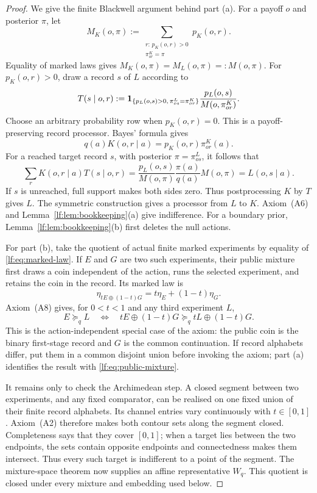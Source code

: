 \begin{proof}
We give the finite Blackwell argument behind part \textup{(a)}.  For a payoff
$o$ and posterior $\pi$, let
\[
M_K(o,\pi):=
\sum_{\substack{r:\,p_K(o,r)>0\\ \pi^K_{or}=\pi}} p_K(o,r).
\]
Equality of marked laws gives $M_K(o,\pi)=M_L(o,\pi)=:M(o,\pi)$.
For $p_K(o,r)>0$, draw a record $s$ of $L$ according to
\begin{equation}
T(s\mid o,r):=
\mathbf 1_{\{p_L(o,s)>0,\,\pi^L_{os}=\pi^K_{or}\}}
\frac{p_L(o,s)}{M(o,\pi^K_{or})}.
\label{lf:eq:matching-processor}
\end{equation}
Choose an arbitrary probability row when $p_K(o,r)=0$.  This is a
payoff-preserving record processor.  Bayes' formula gives
\[
q(a)K(o,r\mid a)=p_K(o,r)\pi^K_{or}(a).
\]
For a reached target record $s$, with posterior $\pi=\pi^L_{os}$, it follows
that
\[
\sum_r K(o,r\mid a)T(s\mid o,r)
=\frac{p_L(o,s)}{M(o,\pi)}
  \frac{\pi(a)}{q(a)}M(o,\pi)
=L(o,s\mid a).
\]
If $s$ is unreached, full support makes both sides zero.  Thus postprocessing
$K$ by $T$ gives $L$.  The symmetric construction gives a
processor from $L$ to $K$.  Axiom~\textup{(A6)} and
Lemma~\ref{lf:lem:bookkeeping}\textup{(a)} give indifference.  For a boundary
prior, Lemma~\ref{lf:lem:bookkeeping}\textup{(b)} first deletes the null
actions.

For part \textup{(b)}, take the quotient of actual finite marked experiments by
equality of \eqref{lf:eq:marked-law}.  If $E$ and $G$ are two such experiments,
their public mixture first draws a coin independent of the action, runs the
selected experiment, and retains the coin in the record.  Its marked law is
\begin{equation}
\eta_{tE\oplus(1-t)G}=t\eta_E+(1-t)\eta_G.
\label{lf:eq:public-mixture}
\end{equation}
Axiom~\textup{(A8)} gives, for $0<t<1$ and any third experiment $L$,
\begin{equation}
E\succeq_q L
\quad\Longleftrightarrow\quad
tE\oplus(1-t)G\succeq_q tL\oplus(1-t)G.
\label{lf:eq:mixture-independence}
\end{equation}
This is the action-independent special case of the axiom: the public coin is the binary first-stage record and
$G$ is the common continuation.  If record alphabets differ, put them in a common disjoint union before invoking
the axiom; part \textup{(a)} identifies the result with
\eqref{lf:eq:public-mixture}.

It remains only to check the Archimedean step.  A closed segment between two
experiments, and any fixed comparator, can be realised on one fixed union of
their finite record alphabets.  Its channel entries vary continuously with
$t\in[0,1]$.
Axiom~\textup{(A2)} therefore makes both contour sets along the segment closed.
Completeness says that they cover $[0,1]$; when a target lies between the two
endpoints, the sets contain opposite endpoints and connectedness makes them
intersect.  Thus every such target is indifferent to a point of the segment.
The mixture-space theorem now supplies an affine representative $W_q$.  This
quotient is closed under every mixture and embedding used below.
\end{proof}

